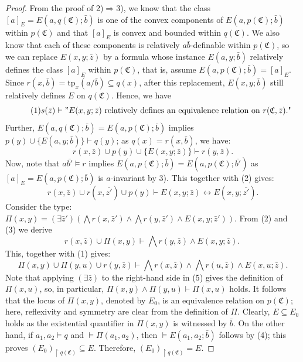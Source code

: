 \documentclass{amsart}
\theoremstyle{definition}
\theoremstyle{definition}
\def\strok{\restriction}
\newcommand{\Mon}{\mathfrak C}
\newcommand{\tp}{\mathrm{tp}}
\begin{document}
\begin{proof}
From the proof of 2)$\Rightarrow$3), we know that the class $[a]_E=E(a,q(\Mon);\bar b)$ is one of the convex components of $E(a,p(\Mon);\bar b)$ within $p(\Mon)$ and that $[a]_E$ is convex and bounded within $q(\Mon)$. We also know that each of these components is relatively $a\bar b$-definable within $p(\Mon)$, so we can replace $E(x,y;\bar z)$ by a formula whose instance $E(a,y;\bar b)$ relatively defines the class $[a]_E$ within $p(\Mon)$, that is, assume $E(a,p(\Mon);\bar b)=[a]_E$. Since $r(x,\bar b)=\tp_x(a/\bar b)\subseteq q(x)$, after this replacement, $E(x,y;\bar b)$ still relatively defines $E$ on $q(\Mon)$. Hence, we have
\begin{equation}\tag{1}
    s(\bar z)\vdash"\text{$E(x,y;\bar z)$ relatively defines an equivalence relation on $r(\Mon,\bar z)$."}
\end{equation}
Further, $E(a,q(\Mon);\bar b)= E(a,p(\Mon);\bar b)$ implies $p(y)\cup\{E(a,y;\bar b)\}\vdash q(y)$; as $q(x)=r(x,\bar b)$, we have:
\begin{equation}\tag{2}
    r(x,\bar z)\cup p(y)\cup\{E(x,y;\bar z)\}\vdash r(y,\bar z).
\end{equation}
Now, note that $a\bar{b'}\models r$ implies $E(a,p(\Mon);\bar b)=E(a,p(\Mon);\bar{b'})$ as $[a]_E=E(a,p(\Mon);\bar b)$ is $a$-invariant by 3). This together with (2) gives:
\begin{equation}\tag{3}
    r(x,\bar z)\cup r(x,\bar{z'})\cup p(y)\vdash E(x,y;\bar z)\leftrightarrow E(x,y;\bar{z'}).
\end{equation}
Consider the type: $\Pi(x,y)=(\exists\bar z')(\bigwedge r(x,\bar z')\land \bigwedge r(y,\bar z')\land E(x,y;\bar z')).$ From (2) and (3) we derive 
\begin{equation}\tag{4}
    r(x,\bar z)\cup \Pi(x,y)\vdash \bigwedge r(y,\bar{z})\land E(x,y;\bar{z}).  \ 
\end{equation}
This, together with (1) gives:
\begin{equation}\tag{5}
\Pi(x,y)\cup \Pi(y,u)\cup r(y,\bar z)\vdash \bigwedge r(x,\bar{z})\land \bigwedge r(u,\bar{z})\land E(x,u;\bar{z}). 
\end{equation}
Note that applying $(\exists \bar z)$ to the right-hand side in (5) gives the definition of $\Pi(x,u)$, so, in particular, $\Pi(x,y)\land \Pi(y,u)\vdash \Pi(x,u)$ holds. It follows that the locus of $\Pi(x,y)$, denoted by $E_0$, is an equivalence relation on $p(\Mon)$; here, reflexivity and symmetry are clear from the definition of $\Pi$.
Clearly, $E\subseteq E_0$ holds as the existential quantifier in $\Pi(x,y)$ is witnessed by $\bar b$. On the other hand, if $a_1,a_2\models q$ and $\models \Pi(a_1,a_2)$, then $\models E(a_1,a_2;\bar b)$ follows by (4); this proves $(E_0)_{\strok q(\Mon)}\subseteq E$. Therefore, $(E_0)_{\strok q(\Mon)}=E$.


\end{proof}
\end{document}
